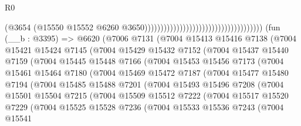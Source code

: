 \begin{lexlean}{R0}
\begin{coremodule}
                                                                          (@3654
                                                                            (@15550
                                                                              @15552
                                                                              @6260
                                                                              @3650)))))))))))))))))))))))))))))))))))))
    (fun (__b : @3395) =>
    @6620
      (@7006
        @7131
        (@7004
          @15413
          @15416
          @7138
          (@7004
            @15421
            @15424
            @7145
            (@7004
              @15429
              @15432
              @7152
              (@7004
                @15437
                @15440
                @7159
                (@7004
                  @15445
                  @15448
                  @7166
                  (@7004
                    @15453
                    @15456
                    @7173
                    (@7004
                      @15461
                      @15464
                      @7180
                      (@7004
                        @15469
                        @15472
                        @7187
                        (@7004
                          @15477
                          @15480
                          @7194
                          (@7004
                            @15485
                            @15488
                            @7201
                            (@7004
                              @15493
                              @15496
                              @7208
                              (@7004
                                @15501
                                @15504
                                @7215
                                (@7004
                                  @15509
                                  @15512
                                  @7222
                                  (@7004
                                    @15517
                                    @15520
                                    @7229
                                    (@7004
                                      @15525
                                      @15528
                                      @7236
                                      (@7004
                                        @15533
                                        @15536
                                        @7243
                                        (@7004
                                          @15541

\end{coremodule}
\end{lexlean}

